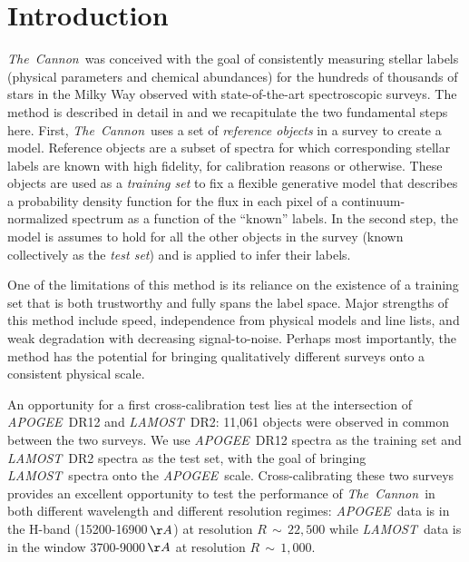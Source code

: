\documentclass[12pt, preprint]{aastex}
\newcommand{\tc}{\textsl{The~Cannon}}
\newcommand{\apogee}{\textsl{APOGEE}}
\newcommand{\lamost}{\textsl{LAMOST}}
\begin{document}

\section{Introduction}

\tc\ was conceived with the goal of consistently measuring stellar labels 
(physical parameters and chemical abundances) for the hundreds of thousands of 
stars in the Milky Way observed with state-of-the-art spectroscopic surveys. 
The method is described in detail in \citep{ness2015} and we recapitulate the 
two fundamental steps here. First, \tc\ uses a set of \emph{reference objects}
in a survey to create a model. Reference objects are a subset of spectra for
which corresponding stellar labels are known with high fidelity, for
calibration reasons or otherwise. These objects are used as a
\emph{training set} to fix a flexible generative model that describes 
a probability density function for the flux in each pixel of a 
continuum-normalized spectrum as a function of the ``known'' labels.
In the second step, the model is assumes to hold for all the 
other objects in the survey (known collectively as the \emph{test set}) and 
is applied to infer their labels. 

One of the limitations of this method is its reliance on the existence of a 
training set that is both trustworthy and fully spans the label space.
Major strengths of this method include speed, independence from physical 
models and line lists, and weak degradation with decreasing signal-to-noise. 
Perhaps most importantly, the method has the potential for bringing 
qualitatively different surveys onto a consistent physical scale.

An opportunity for a first cross-calibration test lies at the intersection
of \apogee\ DR12 and \lamost\ DR2: 11,061 objects were observed in common
between the two surveys. We use \apogee\ DR12 spectra as the 
training set and \lamost\ DR2 spectra as the test set, 
with the goal of bringing \lamost\ spectra onto the \apogee\ scale. 
Cross-calibrating these two surveys provides an excellent opportunity to test
the performance of \tc\ in both different wavelength and different resolution
regimes: \apogee\ data is in the H-band (15200-16900\,$\AA$) at resolution 
$R\,\sim\,22,500$ while \lamost\ data is in the window 3700-9000\,$\AA$ at
resolution $R\,\sim\,1,000$. 
\end{document}
